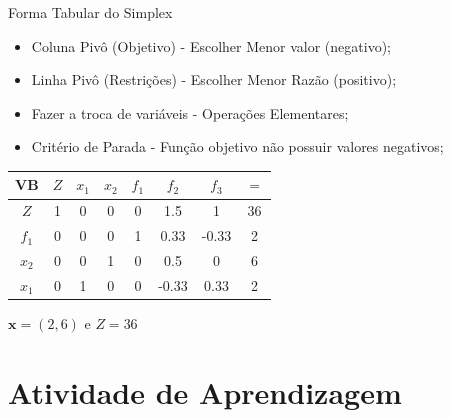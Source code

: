 \documentclass{if-beamer}
\begin{document}
\begin{frame}{Forma Tabular do Simplex}

\begin{itemize}
    \item {} Coluna Pivô (Objetivo) - Escolher Menor valor (negativo);
    \item {} Linha Pivô (Restrições) - Escolher Menor Razão (positivo);
    \item {} Fazer a troca de variáveis - Operações Elementares;
    \item {} Critério de Parada - Função objetivo não possuir valores negativos;
\end{itemize}

\begin{table}
    \centering
    \begin{tabular}{c|ccccccc}
    \hline
    VB    & $Z$ & $x_1$ & $x_2$ & $f_1$ & $f_2$ & $f_3$ & $=$  \\
    \hline
    $Z$   & 1   & 0     & 0     & 0     & 1.5   & 1     & 36   \\
    $f_1$ & 0   & 0     & 0     & 1     & 0.33  & -0.33 & 2    \\
    \rowcolor[HTML]{CBCEFB}
    $x_2$ & 0   & 0     & 1     & 0     & 0.5   & 0     & 6    \\
    \rowcolor[HTML]{CBCEFB}
    $x_1$ & 0   & 1     & 0     & 0     & -0.33 & 0.33  & 2    \\
    \hline
    \end{tabular}
\end{table}

 $\mathbf{x} = (2,6)$ e $Z = 36$

\end{frame}


\section{Atividade de Aprendizagem}

\end{document}
